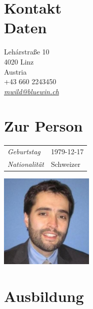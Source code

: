 \documentclass[line,11pt,a4paper]{../resume}
\newcommand{\mail}[1]{\textsl{\href{mailto:#1}{#1}}}
\begin{document}
\begin{resume}

\begin{multicols}{2}

\section{\mysidestyle Kontakt\\Daten}\vspace{2mm}

Leh\'{a}rstra{\ss}e 10 \\
4020 Linz \\
Austria \\
+43 660 2243450 \\
\mail{mwild@bluewin.ch}

\section{\mysidestyle Zur Person}\vspace{2mm}

\begin{tabular}{@{}ll}
\textsl{Geburtstag} & 1979-12-17 \\
\textsl{Nationalit\"at}   & Schweizer
\end{tabular}

\columnbreak
\vspace*{-9mm}\hfill\includegraphics[width=45mm]{../mwild}

\end{multicols}

\section{\mysidestyle Ausbildung}\vspace{2mm}


\end{resume}
\end{document}
